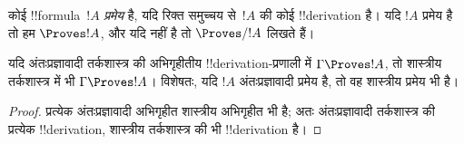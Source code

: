 \documentclass[../../../include/open-logic-section]{subfiles}
\begin{document}
\begin{defn}[प्रमेय]
कोई !!{formula}~$!A$ \emph{प्रमेय} है, यदि रिक्त समुच्चय से~$!A$ की कोई
!!{derivation} है। यदि $!A$ प्रमेय है तो हम $\Proves !A$, और यदि नहीं है
तो $\Proves/ !A$ लिखते हैं।
\end{defn}

\begin{prop}
  यदि अंतःप्रज्ञावादी तर्कशास्त्र की अभिगृहीतीय !!{derivation}-प्रणाली में
  $\Gamma \Proves !A$, तो शास्त्रीय तर्कशास्त्र में भी
  $\Gamma \Proves !A$। विशेषतः, यदि $!A$ अंतःप्रज्ञावादी प्रमेय है, तो वह
  शास्त्रीय प्रमेय भी है।
\end{prop}

\begin{proof}
  प्रत्येक अंतःप्रज्ञावादी अभिगृहीत शास्त्रीय अभिगृहीत भी है; अतः
  अंतःप्रज्ञावादी तर्कशास्त्र की प्रत्येक !!{derivation}, शास्त्रीय
  तर्कशास्त्र की भी !!{derivation} है।
\end{proof}
\end{document}
